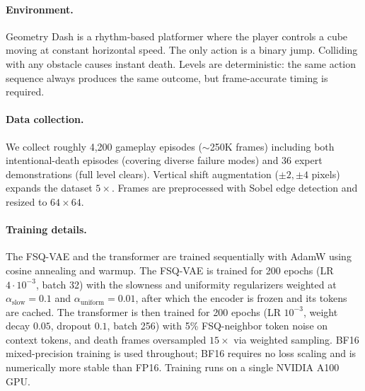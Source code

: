 \documentclass{article}
\newcommand{\imgsize}{64 \times 64}
\begin{document}
\paragraph{Environment.}
Geometry Dash is a rhythm-based platformer where the player controls a cube moving at constant horizontal speed.
The only action is a binary jump.
Colliding with any obstacle causes instant death.
Levels are deterministic: the same action sequence always produces the same outcome, but frame-accurate timing is required.

\paragraph{Data collection.}
We collect roughly 4,200 gameplay episodes ($\sim$250K frames) including both intentional-death episodes (covering diverse failure modes) and 36 expert demonstrations (full level clears).
Vertical shift augmentation ($\pm 2, \pm 4$ pixels) expands the dataset $5\times$.
Frames are preprocessed with Sobel edge detection and resized to $\imgsize$.

\paragraph{Training details.}
The FSQ-VAE and the transformer are trained sequentially with AdamW using cosine annealing and warmup. The FSQ-VAE is trained for 200 epochs (LR $4\cdot 10^{-3}$, batch 32) with the slowness and uniformity regularizers weighted at $\alpha_\text{slow} = 0.1$ and $\alpha_\text{uniform} = 0.01$, after which the encoder is frozen and its tokens are cached. The transformer is then trained for 200 epochs (LR $10^{-3}$, weight decay $0.05$, dropout $0.1$, batch 256) with 5\% FSQ-neighbor token noise on context tokens, and death frames oversampled $15\times$ via weighted sampling.
BF16 mixed-precision training is used throughout; BF16 requires no loss scaling and is numerically more stable than FP16.
Training runs on a single NVIDIA A100 GPU.
\end{document}
